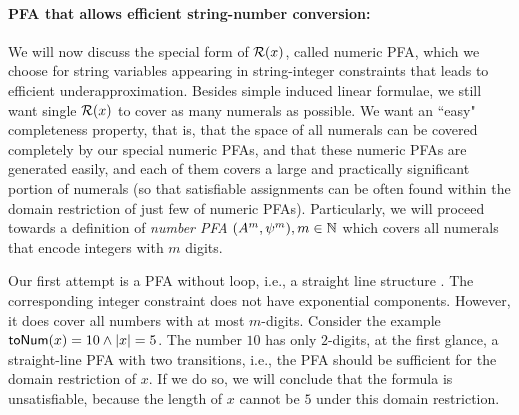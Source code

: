 \documentclass[sigplan,review,anonymous]{acmart}\settopmatter{printfolios=true,printccs=false,printacmref=false}
\begin{document}
\paragraph{PFA that allows efficient string-number conversion: } 
We will now discuss the special form of $\mathcal{R}(x)$, called numeric PFA, which we choose for string variables appearing in string-integer constraints that leads to efficient underapproximation.
%
Besides simple induced linear formulae, we still want single $\mathcal{R}(x)$ to cover as many numerals as possible.
We want an ``easy" completeness property, that is, that the space of all numerals can be covered completely by our special numeric PFAs, and that these numeric PFAs are generated easily, and each of them covers a large and practically significant portion of numerals (so that satisfiable assignments can be often found within the domain restriction of just few of numeric PFAs).
%
Particularly, we will proceed towards a definition of \emph{number PFA} $(A^m,\psi^m),m\in\mathbb{N}$ which covers all numerals that encode integers with $m$ digits.

Our first attempt is a PFA without loop, i.e., a straight line structure 
. The corresponding integer constraint does not have exponential components. However, it does cover all numbers with at most $m$-digits. Consider the example $\mbox{\textsf{toNum}($x$)}=10 \wedge |x|=5$. The number $10$ has only $2$-digits, at the first glance, a straight-line PFA with two transitions, i.e., the PFA
     should be sufficient for the domain restriction of $x$. If we do so, we will conclude that the formula is unsatisfiable, because the length of $x$ cannot be $5$  under this domain restriction.
\end{document}
